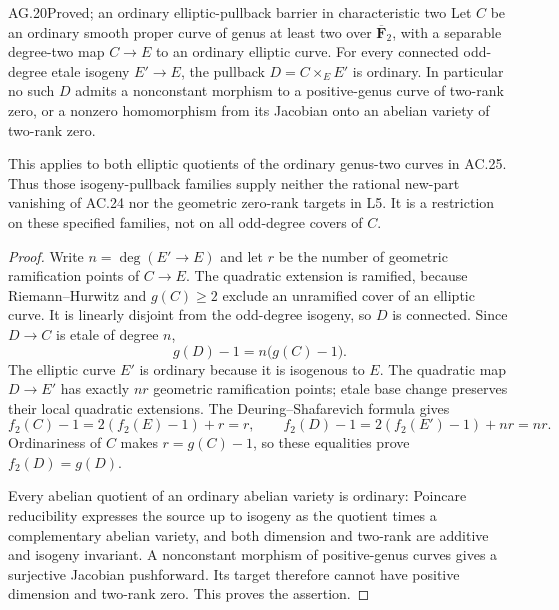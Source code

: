 \begin{claim}{AG.20}{Proved; an ordinary elliptic-pullback barrier in characteristic two}
Let $C$ be an ordinary smooth proper curve of genus at
least two over $\overline{\mathbf F}_2$, with a separable
degree-two map $C\to E$ to an ordinary elliptic curve.
For every connected odd-degree etale isogeny $E'\to E$,
the pullback $D=C\times_E E'$ is ordinary. In particular
no such $D$ admits a nonconstant morphism to a
positive-genus curve of two-rank zero, or a nonzero
homomorphism from its Jacobian onto an abelian variety
of two-rank zero.

This applies to both elliptic quotients of the ordinary
genus-two curves in AC.25. Thus those isogeny-pullback
families supply neither the rational new-part vanishing
of AC.24 nor the geometric zero-rank targets in L5.
It is a restriction on these specified families, not on
all odd-degree covers of $C$.
\end{claim}
\begin{proof}
Write $n=\deg(E'\to E)$ and let $r$ be the number
of geometric ramification points of $C\to E$.
The quadratic extension is ramified, because
Riemann--Hurwitz and $g(C)\ge2$ exclude an unramified
cover of an elliptic curve. It is linearly disjoint from
the odd-degree isogeny, so $D$ is connected.
Since $D\to C$ is etale of degree $n$,
\[
                      g(D)-1=n\bigl(g(C)-1\bigr).
\]
The elliptic curve $E'$ is ordinary because it is
isogenous to $E$. The quadratic map $D\to E'$ has
exactly $nr$ geometric ramification points; etale base
change preserves their local quadratic extensions.
The Deuring--Shafarevich formula
\citep[Corollary~1.8]{AG_Crew1984} gives
\[
 f_2(C)-1=2(f_2(E)-1)+r=r,
 \qquad f_2(D)-1=2(f_2(E')-1)+nr=nr.
\]
Ordinariness of $C$ makes $r=g(C)-1$, so these
equalities prove $f_2(D)=g(D)$.

Every abelian quotient of an ordinary abelian variety
is ordinary: Poincare reducibility expresses the source
up to isogeny as the quotient times a complementary
abelian variety, and both dimension and two-rank are
additive and isogeny invariant. A nonconstant morphism
of positive-genus curves gives a surjective Jacobian
pushforward. Its target therefore cannot have positive
dimension and two-rank zero. This proves the assertion.
\end{proof}

